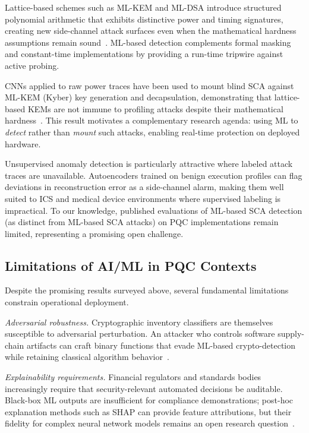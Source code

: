 \documentclass[journal]{IEEEtran}
\begin{document}
Lattice-based schemes such as ML-KEM and ML-DSA introduce structured
polynomial arithmetic that exhibits distinctive power and timing
signatures, creating new side-channel attack surfaces even when the
mathematical hardness assumptions remain
sound~\cite{ravi2020sidechannel,ngo2021riscv}. ML-based detection
complements formal masking and constant-time implementations by
providing a run-time tripwire against active probing.

CNNs applied to raw power traces have been used to mount blind SCA against
ML-KEM (Kyber) key generation and decapsulation, demonstrating that
lattice-based KEMs are not immune to profiling attacks despite their
mathematical hardness~\cite{ravi2023mlsca}. This result motivates a
complementary research agenda: using ML to \emph{detect} rather than
\emph{mount} such attacks, enabling real-time protection on deployed
hardware.

Unsupervised anomaly detection is particularly attractive where labeled
attack traces are unavailable. Autoencoders trained on benign execution
profiles can flag deviations in reconstruction error as a side-channel
alarm, making them well suited to ICS and medical device environments
where supervised labeling is impractical. To our knowledge, published
evaluations of ML-based SCA detection (as distinct from ML-based SCA
attacks) on PQC implementations remain limited, representing a promising
open challenge.

\subsection{Limitations of AI/ML in PQC Contexts}
\label{subsec:aiml_limits}

Despite the promising results surveyed above, several fundamental
limitations constrain operational deployment.

\textit{Adversarial robustness.} Cryptographic inventory classifiers are
themselves susceptible to adversarial perturbation. An attacker who
controls software supply-chain artifacts can craft binary functions that
evade ML-based crypto-detection while retaining classical algorithm
behavior~\cite{pierazzi2020problemspace}.

\textit{Explainability requirements.} Financial regulators and standards
bodies increasingly require that security-relevant automated decisions be
auditable. Black-box ML outputs are insufficient for compliance
demonstrations; post-hoc explanation methods such as SHAP can provide
feature attributions, but their fidelity for complex neural network models
remains an open research question~\cite{arrieta2020xai}.
\end{document}
